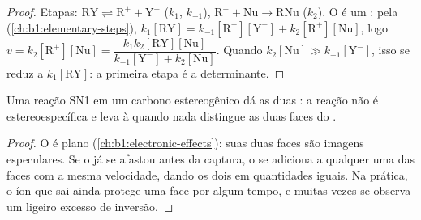 \begin{proof}
Etapas: $\mathrm{RY} \rightleftharpoons \mathrm{R^+} + \mathrm{Y^-}$ ($k_1$,
$k_{-1}$), $\mathrm{R^+} + \mathrm{Nu} \to \mathrm{RNu}$ ($k_2$). O
 é um : pela  (\cref{ch:b1:elementary-steps}), $k_1[\mathrm{RY}] =
k_{-1}[\mathrm{R^+}][\mathrm{Y^-}] + k_2[\mathrm{R^+}][\mathrm{Nu}]$, logo
$v = k_2[\mathrm{R^+}][\mathrm{Nu}] = \dfrac{k_1k_2[\mathrm{RY}][\mathrm{Nu}]}
{k_{-1}[\mathrm{Y^-}] + k_2[\mathrm{Nu}]}$. Quando $k_2[\mathrm{Nu}] \gg
k_{-1}[\mathrm{Y^-}]$, isso se reduz a $k_1[\mathrm{RY}]$: a primeira
etapa é a determinante.
\end{proof}

\begin{proposition}[Estereoquímica da SN1]\label{prop:b1:nucleophilic-substitution:sn1-stereo}
Uma reação SN1 em um carbono estereogênico dá as duas : a
reação não é estereoespecífica e leva à  quando nada
distingue as duas faces do .
\end{proposition}

\begin{proof}
O  é plano (\cref{ch:b1:electronic-effects}): suas duas faces
são imagens especulares. Se o  já se afastou antes da
captura, o  se adiciona a qualquer uma das faces com a mesma
velocidade, dando os dois  em quantidades iguais. Na
prática, o íon que sai ainda protege uma face por algum tempo, e muitas
vezes se observa um ligeiro excesso de inversão.
\end{proof}

